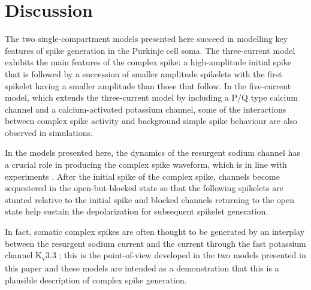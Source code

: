 \documentclass[utf8]{frontiersSCNS} %
\newcommand{\msi}{\,\mathrm{mS cm^{-2}}}
\newcommand{\sk}{\mathrm{SK}}
\begin{document}


\section{Discussion}

The two single-compartment models presented here succeed in modelling
key features of spike generation in the Purkinje cell soma. The
three-current model exhibits the main features of the complex spike: a
high-amplitude initial spike that is followed by a succession of
smaller amplitude spikelets with the first spikelet having a smaller
amplitude than those that follow. In the five-current model, which
extends the three-current model by including a P/Q type calcium
channel and a calcium-activated potassium channel, some of the
interactions between complex spike activity and background simple
spike behaviour are also observed in simulations.

In the models presented here, the dynamics of the resurgent sodium
channel has a crucial role in producing the complex spike waveform,
which is in line with experiments \cite{RamanBean1997}. After the
initial spike of the complex spike, channels become sequestered in the
open-but-blocked state so that the following spikelets are stunted
relative to the initial spike and blocked channels returning to the
open state help sustain the depolarization for subsequent spikelet
generation.

In fact, somatic complex spikes are often thought to be generated by
an interplay between the resurgent sodium current
\cite{RamanBean1997,RamanBean2001,KhaliqEtAl2003,KhaliqRaman2006} and
the current through the fast potassium channel K\textsubscript{v}3.3
\cite{ZaghaEtAl2008,HurlockEtAl2008,VeysEtAl2013}; this is the
point-of-view developed in the two models presented in this paper and
these models are intended as a demonstration that this is a plausible
description of complex spike generation.
\end{document}
